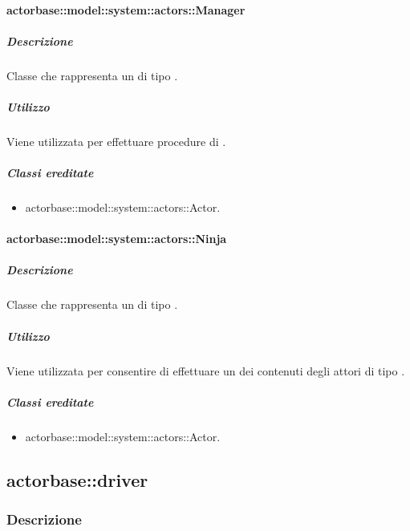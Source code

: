 \documentclass{scalatekids-article}
\begin{document}
\paragraph{actorbase::model::system::actors::Manager}

\subparagraph{Descrizione}

Classe che rappresenta un  di tipo .

\subparagraph{Utilizzo}

Viene utilizzata per effettuare procedure di .

\subparagraph{Classi ereditate}

\begin{itemize}
\item actorbase::model::system::actors::Actor.
\end{itemize}

\paragraph{actorbase::model::system::actors::Ninja}

\subparagraph{Descrizione}

Classe che rappresenta un  di tipo .

\subparagraph{Utilizzo}

Viene utilizzata per consentire di effettuare un  dei contenuti
degli attori di tipo .

\subparagraph{Classi ereditate}

\begin{itemize}
\item actorbase::model::system::actors::Actor.
\end{itemize}


\subsection{actorbase::driver}
\label{sec:actorbase::driver}

\subsubsection{Descrizione}
\end{document}

